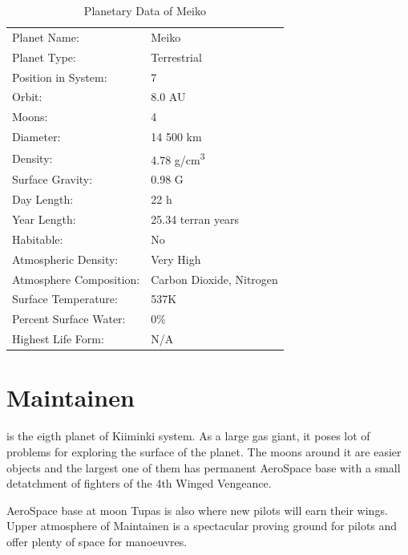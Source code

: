 \documentclass{tufte-book}
\begin{document}
\bigskip
\begin{table}
\begin{minipage}{\textwidth}
\begin{center}
\begin{tabular}{ll}
\toprule
Planet Name: & Meiko \\
Planet Type: & Terrestrial \\
Position in System: & 7 \\
Orbit: & 8.0 AU \\
Moons: & 4 \\
Diameter: & 14 500 km \\
Density: & 4.78 g/cm\textsuperscript{3} \\
Surface Gravity: & 0.98 G \\
Day Length: & 22 h \\
Year Length: & 25.34 terran years \\
Habitable: & No \\
\quad Atmospheric Density: & Very High \\
\quad Atmosphere Composition: & Carbon Dioxide, Nitrogen \\
\quad Surface Temperature: & 537K \\
\quad Percent Surface Water: & 0\% \\
\quad Highest Life Form: & N/A \\

\bottomrule
\end{tabular}
\end{center}
\end{minipage}
\caption{Planetary Data of Meiko}
\end{table}

\section{Maintainen}

 is the eigth planet of Kiiminki system. As a large gas
giant, it poses lot of problems for exploring the surface of the planet. The
moons around it are easier objects and the largest one of them has permanent
AeroSpace base with a small detatchment of fighters of the 4th Winged
Vengeance.

AeroSpace base at moon Tupas is also where new pilots will earn their wings.
Upper atmosphere of Maintainen is a spectacular proving ground for pilots and
offer plenty of space for manoeuvres.
\end{document}
